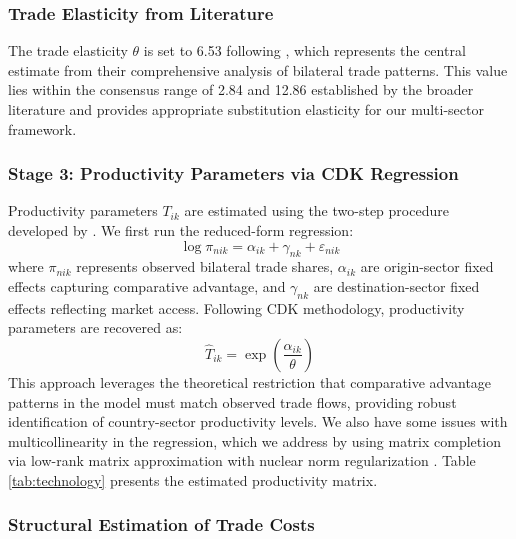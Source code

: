 \subsubsection{Trade Elasticity from Literature}

The trade elasticity $\theta$ is set to 6.53 following \cite{costinot2012TheReviewofEconomicStudies}, which represents the central estimate from their comprehensive analysis of bilateral trade patterns. This value lies within the consensus range of 2.84 and 12.86 established by the broader literature \citep{eaton2002Econometrica} and provides appropriate substitution elasticity for our multi-sector framework.

\subsubsection{Stage 3: Productivity Parameters via CDK Regression}

Productivity parameters $T_{ik}$ are estimated using the two-step procedure developed by \cite{costinot2012TheReviewofEconomicStudies}. We first run the reduced-form regression:
\begin{equation}
\log \pi_{nik} = \alpha_{ik} + \gamma_{nk} + \varepsilon_{nik}
\end{equation}
where $\pi_{nik}$ represents observed bilateral trade shares, $\alpha_{ik}$ are origin-sector fixed effects capturing comparative advantage, and $\gamma_{nk}$ are destination-sector fixed effects reflecting market access. Following CDK methodology, productivity parameters are recovered as:
\begin{equation}\hat{T}_{ik} = \exp\left(\frac{\hat{\alpha}_{ik}}{\theta}\right)
\end{equation}
This approach leverages the theoretical restriction that comparative advantage patterns in the model must match observed trade flows, providing robust identification of country-sector productivity levels. We also have some issues with multicollinearity in the regression, which we address by using matrix completion via low-rank matrix approximation with nuclear norm regularization \citep{mazumder2010spectral}. Table \ref{tab:technology} presents the estimated productivity matrix.

\subsubsection{Structural Estimation of Trade Costs}

